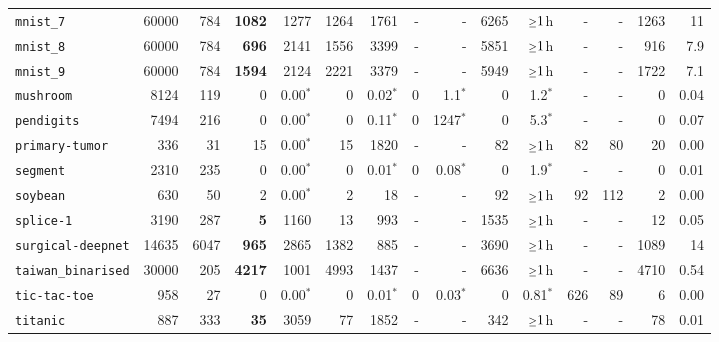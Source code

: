 \begin{tabular}{lccrrrrrrrrrrrr}
\texttt{mnist\_7} & \multicolumn{1}{r}{60000} & \multicolumn{1}{r}{784}  & \textbf{1082} & 1277 & 1264 & 1761 & - & - & 6265 & $\mathsmaller{\geq}1$h & - & - & 1263 & 11\\
\texttt{mnist\_8} & \multicolumn{1}{r}{60000} & \multicolumn{1}{r}{784}  & \textbf{696} & 2141 & 1556 & 3399 & - & - & 5851 & $\mathsmaller{\geq}1$h & - & - & 916 & 7.9\\
\texttt{mnist\_9} & \multicolumn{1}{r}{60000} & \multicolumn{1}{r}{784}  & \textbf{1594} & 2124 & 2221 & 3379 & - & - & 5949 & $\mathsmaller{\geq}1$h & - & - & 1722 & 7.1\\
\texttt{mushroom} & \multicolumn{1}{r}{8124} & \multicolumn{1}{r}{119}  & 0 & 0.00$^*$ & 0 & 0.02$^*$ & 0 & 1.1$^*$ & 0 & 1.2$^*$ & - & - & 0 & 0.04\\
\texttt{pendigits} & \multicolumn{1}{r}{7494} & \multicolumn{1}{r}{216}  & 0 & 0.00$^*$ & 0 & 0.11$^*$ & 0 & 1247$^*$ & 0 & 5.3$^*$ & - & - & 0 & 0.07\\
\texttt{primary-tumor} & \multicolumn{1}{r}{336} & \multicolumn{1}{r}{31}  & 15 & 0.00$^*$ & 15 & 1820 & - & - & 82 & $\mathsmaller{\geq}1$h & 82 & 80 & 20 & 0.00\\
\texttt{segment} & \multicolumn{1}{r}{2310} & \multicolumn{1}{r}{235}  & 0 & 0.00$^*$ & 0 & 0.01$^*$ & 0 & 0.08$^*$ & 0 & 1.9$^*$ & - & - & 0 & 0.01\\
\texttt{soybean} & \multicolumn{1}{r}{630} & \multicolumn{1}{r}{50}  & 2 & 0.00$^*$ & 2 & 18 & - & - & 92 & $\mathsmaller{\geq}1$h & 92 & 112 & 2 & 0.00\\
\texttt{splice-1} & \multicolumn{1}{r}{3190} & \multicolumn{1}{r}{287}  & \textbf{5} & 1160 & 13 & 993 & - & - & 1535 & $\mathsmaller{\geq}1$h & - & - & 12 & 0.05\\
\texttt{surgical-deepnet} & \multicolumn{1}{r}{14635} & \multicolumn{1}{r}{6047}  & \textbf{965} & 2865 & 1382 & 885 & - & - & 3690 & $\mathsmaller{\geq}1$h & - & - & 1089 & 14\\
\texttt{taiwan\_binarised} & \multicolumn{1}{r}{30000} & \multicolumn{1}{r}{205}  & \textbf{4217} & 1001 & 4993 & 1437 & - & - & 6636 & $\mathsmaller{\geq}1$h & - & - & 4710 & 0.54\\
\texttt{tic-tac-toe} & \multicolumn{1}{r}{958} & \multicolumn{1}{r}{27}  & 0 & 0.00$^*$ & 0 & 0.01$^*$ & 0 & 0.03$^*$ & 0 & 0.81$^*$ & 626 & 89 & 6 & 0.00\\
\texttt{titanic} & \multicolumn{1}{r}{887} & \multicolumn{1}{r}{333}  & \textbf{35} & 3059 & 77 & 1852 & - & - & 342 & $\mathsmaller{\geq}1$h & - & - & 78 & 0.01\\

\end{tabular}
